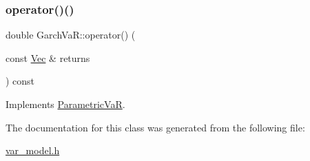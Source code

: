 \hypertarget{classGarchVaR_ac6d01b6567a6d0629cd95be716677763}{}\label{classGarchVaR_ac6d01b6567a6d0629cd95be716677763} 
\subsubsection{\texorpdfstring{operator()()}{operator()()}\hspace{0.1cm}{\footnotesize\ttfamily [3/3]}}
{\footnotesize\ttfamily double Garch\+Va\+R\+::operator() (\begin{DoxyParamCaption}\item[{const \hyperlink{compute__returns__eigen_8h_a1eb6a9306ef406d7975f3cbf2e247777}{Vec} \&}]{returns }\end{DoxyParamCaption}) const\hspace{0.3cm}{\ttfamily [virtual]}}



Implements \hyperlink{classParametricVaR_aa07f1d64aff5abf484835cd9105af9c9}{Parametric\+VaR}.



The documentation for this class was generated from the following file\+:\begin{DoxyCompactItemize}
\item 
\hyperlink{var__model_8h}{var\+\_\+model.\+h}\end{DoxyCompactItemize}
